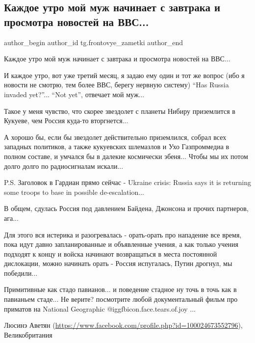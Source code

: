  
 
 
 
 
 
\subsection{Каждое утро мой муж начинает с завтрака и просмотра новостей на ВВС...}
\label{sec:15_02_2022.tg.frontovye_zametki.1.novosti_bbc}
 
\ifcmt
 author_begin
   author_id tg.frontovye_zametki
 author_end
\fi

Каждое утро мой муж начинает с завтрака и просмотра новостей на ВВС...

И каждое утро, вот уже третий месяц, я задаю ему один и тот же вопрос (ибо я
новости не смотрю, тем более ВВС, берегу нервную систему) \enquote{Has Russia invaded
yet?}... \enquote{Not yet}, отвечает мой муж...

Такое у меня чувство, что скорее звездолет с планеты Нибиру приземлится в
Кукуеве, чем Россия куда-то вторгнется...

А хорошо бы, если бы звездолет действительно приземлился, собрал всех западных
политиков, а также кукуевских шлемазлов и Ухо Газпроммедиа в полном составе, и
умчался бы в далекие космически эбеня... Чтобы мы их потом долго долго по
радиосигналам искали...

P.S. Заголовок в Гардиан прямо сейчас - Ukraine crisis: Russia says it is
returning some troops to base in possible de-escalation...

В общем, сдулась Россия под давлением Байдена, Джонсона и прочих партнеров,
ага...

Для этого вся истерика и разогревалась - орать-орать про нападение все время,
пока идут давно запланированные и объявленные учения, а как только учения
подходят к концу и войска начинают возвращаться в места постоянной дислокации,
можно начинать орать - Россия испугалась, Путин дрогнул, мы победили...

Примитивные как стадо павианов... и поведение стадное ну точь в точь как в
павианьем стаде... Не верите? посмотрите любой документальный фильм про
приматов на National Geographic @igg{fbicon.face.tears.of.joy} ...

Люсинэ Аветян (\url{https://www.facebook.com/profile.php?id=100024673552796}),
Великобритания
